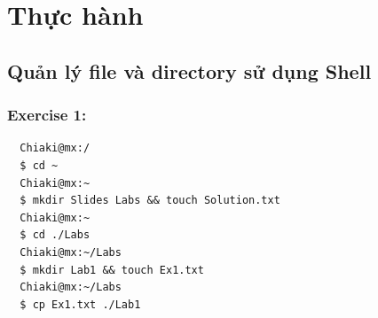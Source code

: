 \documentclass{article}
\begin{document}
\section{Thực hành}
\subsection{Quản lý file và directory sử dụng Shell}
\subsubsection{Exercise 1:}
\begin{verbatim}
  Chiaki@mx:/                                                                                                                                                                                                    
  $ cd ~                                                                                                                                                                                                         
  Chiaki@mx:~                                                                                                                                                                                                    
  $ mkdir Slides Labs && touch Solution.txt                                                                                                                                                                      
  Chiaki@mx:~                                                                                                                                                                                                    
  $ cd ./Labs                                                                                                                                                                                                    
  Chiaki@mx:~/Labs                                                                                                                                                                                               
  $ mkdir Lab1 && touch Ex1.txt                                                                                                                                                                                  
  Chiaki@mx:~/Labs                                                                                                                                                                                               
  $ cp Ex1.txt ./Lab1                                                                                                                                                                                            

\end{verbatim}
\end{document}
